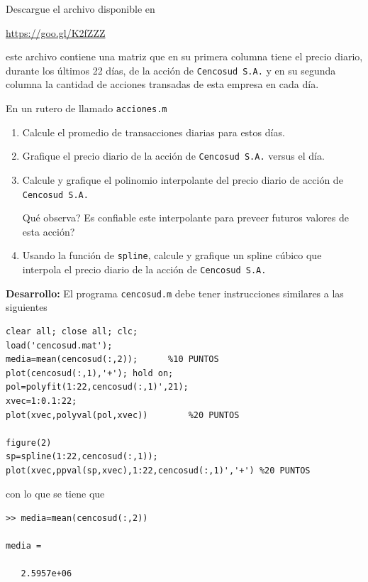 Descargue el archivo disponible en
\begin{center}
\url{https://goo.gl/K2fZZZ}
\end{center}
este archivo contiene una matriz que en su primera columna tiene el precio diario, durante los \'ultimos 22 d\'ias, de la acci\'on de \texttt{Cencosud S.A.} y en su segunda columna la cantidad de acciones transadas de esta empresa en cada d\'ia.

En un rutero de \matlab llamado \texttt{acciones.m}
\begin{enumerate}
\item Calcule el promedio de transacciones diarias para estos d\'ias.
\item Grafique el precio diario de la acci\'on de \texttt{Cencosud S.A.} versus el d\'ia.
\item Calcule y grafique el polinomio interpolante del precio diario de acci\'on de \texttt{Cencosud S.A.}

\textquestiondown Qu\'e observa? \textquestiondown Es confiable este interpolante para preveer futuros valores de esta acci\'on?

\respuesta{5cm}

\item Usando la funci\'on de \matlab \texttt{spline}, calcule y grafique un spline c\'ubico que interpola el precio diario de la acci\'on de \texttt{Cencosud S.A.}
\end{enumerate}
 
\textbf{Desarrollo:} El programa \texttt{cencosud.m} debe tener instrucciones similares a las siguientes
\begin{lstlisting}
clear all; close all; clc;
load('cencosud.mat');
media=mean(cencosud(:,2));		%10 PUNTOS
plot(cencosud(:,1),'+'); hold on;	
pol=polyfit(1:22,cencosud(:,1)',21);
xvec=1:0.1:22;
plot(xvec,polyval(pol,xvec))		%20 PUNTOS

figure(2)
sp=spline(1:22,cencosud(:,1));
plot(xvec,ppval(sp,xvec),1:22,cencosud(:,1)','+') %20 PUNTOS
\end{lstlisting}

con lo que se tiene que 
\begin{lstlisting}
>> media=mean(cencosud(:,2))

media =

   2.5957e+06
\end{lstlisting}

